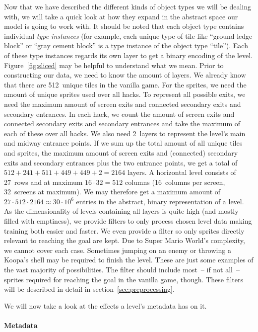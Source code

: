 Now that we have described the different kinds of object types we will
be dealing with, we will take a quick look at how they expand in the
abstract space our model is going to work with. It should be noted
that each object type contains individual \emph{type instances} (for
example, each unique type of tile like ``ground ledge block'' or
``gray cement block'' is a type instance of the object type ``tile'').
Each of these type instances regards its own layer to get a binary
encoding of the level. Figure~\ref{fig:sliced} may be helpful to
understand what we mean. Prior to constructing our data, we need to
know the amount of layers. We already know that there are 512~unique
tiles in the vanilla game. For the sprites, we need the amount of
unique sprites used over all hacks. To represent all possible exits,
we need the maximum amount of screen exits and connected secondary
exits and secondary entrances. In each hack, we count the amount of
screen exits and connected secondary exits and secondary entrances and
take the maximum of each of these over all hacks. We also need
2~layers to represent the level's main and midway entrance points. If
we sum up the total amount of all unique tiles and sprites, the
maximum amount of screen exits and (connected) secondary exits and
secondary entrances plus the two entrance points, we get a total of
$512 + 241 + 511 + 449 + 449 + 2 = 2164$ layers. A horizontal level
consists of 27~rows and at maximum $16 \cdot 32 = 512$ columns (16~columns
per screen, 32~screens at maximum). We may therefore get a maximum
amount of $27 \cdot 512 \cdot 2164 \approx 30 \cdot 10^{6}$ entries in the abstract,
binary representation of a level. \\
As the dimensionality of levels containing all layers is quite high
(and mostly filled with emptiness), we provide filters to only process
chosen level data making training both easier and faster. We even
provide a filter so only sprites directly relevant to reaching the
goal are kept. Due to Super Mario World's complexity, we cannot cover
each case. Sometimes jumping on an enemy or throwing a Koopa's shell
may be required to finish the level. These are just some examples of
the vast majority of possibilities. The filter should include most~--
if not all~-- sprites required for reaching the goal in the vanilla
game, though. These filters will be described in detail in
section~\ref{sec:preprocessing}.

We will now take a look at the effects a level's metadata has on it.

\paragraph{Metadata}
\label{par:metadata}


